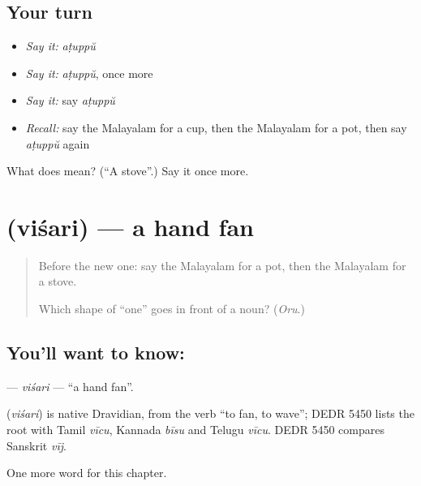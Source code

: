 \subsection*{Your turn}
\begin{itemize}
\raggedright
  \item \emph{Say it:} \emph{aṭuppŭ}
  \item \emph{Say it:} \emph{aṭuppŭ}, once more
  \item \emph{Say it:} say \emph{aṭuppŭ}
  \item \emph{Recall:} say the Malayalam for a cup, then the Malayalam for a pot, then say \emph{aṭuppŭ} again
\end{itemize}

\begin{tcolorbox}[breakable,colback=teal!4,colframe=teal!35!black,title={Before you move on}]
What does  mean? (\textquotedblleft{}A stove\textquotedblright{}.) Say it once more.
\end{tcolorbox}
\section[\texorpdfstring{\ml{വിശറി} (viśari)}{വിശറി (viśari)}]{ (viśari) — a hand fan}

\label{lesson:ML-C157-visari}



\begin{quote}
Before the new one: say the Malayalam for a pot, then the Malayalam for a stove.

Which shape of \textquotedblleft{}one\textquotedblright{} goes in front of a noun? (\emph{Oru}.)
\end{quote}

\subsection*{You'll want to know: }
\textbf{} — \emph{viśari} — \textquotedblleft{}a hand fan\textquotedblright{}.

\begin{cousinweb}
\textbf{} (\emph{viśari}) is native Dravidian, from the verb \textquotedblleft{}to fan, to wave\textquotedblright{}; DEDR 5450 lists the root with Tamil \emph{vīcu}, Kannada \emph{bīsu} and Telugu \emph{vīcu}. DEDR 5450 compares Sanskrit \emph{vīj}.
\end{cousinweb}

\begin{grammarlens}[title={What you've built}]
One more word for this chapter.
\end{grammarlens}

